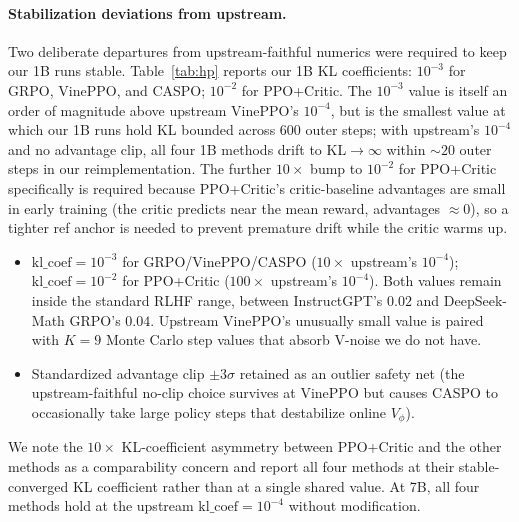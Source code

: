 \documentclass[11pt]{article}
\newcommand{\caspo}{\textsc{CASPO}}
\newcommand{\ppocritic}{PPO+Critic}
\newcommand{\grpo}{GRPO}
\newcommand{\vineppo}{VinePPO}
\begin{document}
\paragraph{Stabilization deviations from upstream.}
Two deliberate departures from upstream-faithful numerics were
required to keep our 1B runs stable. Table~\ref{tab:hp} reports our
1B KL coefficients: $10^{-3}$ for \grpo{}, \vineppo{}, and \caspo{};
$10^{-2}$ for \ppocritic{}. The $10^{-3}$ value is itself an order
of magnitude above upstream \vineppo{}'s $10^{-4}$, but is the
smallest value at which our 1B runs hold KL bounded across 600
outer steps; with upstream's $10^{-4}$ and no advantage clip, all
four 1B methods drift to KL$\to\infty$ within $\sim 20$ outer steps
in our reimplementation. The further $10\times$ bump to $10^{-2}$
for \ppocritic{} specifically is required because \ppocritic{}'s
critic-baseline advantages are small in early training (the critic
predicts near the mean reward, advantages ${\approx}0$), so a
tighter ref anchor is needed to prevent premature drift while the
critic warms up.
\begin{itemize}
\item $\mathrm{kl\_coef} = 10^{-3}$ for \grpo{}/\vineppo{}/\caspo{}
  ($10\times$ upstream's $10^{-4}$); $\mathrm{kl\_coef} = 10^{-2}$
  for \ppocritic{} ($100\times$ upstream's $10^{-4}$). Both values
  remain inside the standard RLHF range, between InstructGPT's
  $0.02$ and DeepSeek-Math GRPO's $0.04$. Upstream \vineppo{}'s
  unusually small value is paired with $K{=}9$ Monte Carlo step
  values that absorb V-noise we do not have.
\item Standardized advantage clip $\pm 3\sigma$ retained as an
  outlier safety net (the upstream-faithful no-clip choice survives
  at \vineppo{} but causes \caspo{} to occasionally take large
  policy steps that destabilize online $V_\phi$).
\end{itemize}
We note the $10\times$ KL-coefficient asymmetry between
\ppocritic{} and the other methods as a comparability concern and
report all four methods at their stable-converged KL coefficient
rather than at a single shared value. At 7B, all four methods hold
at the upstream $\mathrm{kl\_coef}=10^{-4}$ without modification.
\end{document}

